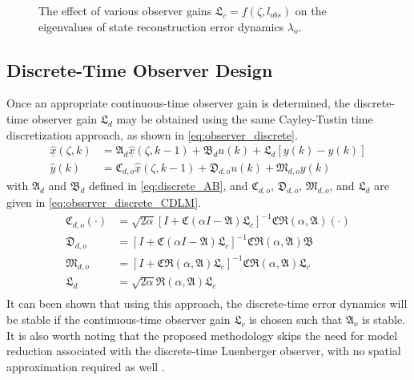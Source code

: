 \begin{figure}[!htbp]
    \centering
    
    \caption{The effect of various observer gains $\mathfrak{L}_c = f(\zeta, l_{obs})$ on the eigenvalues of state reconstruction error dynamics $\lambda_o$.}
    \label{fig:L_vs_lambda}
\end{figure}

\subsection{Discrete-Time Observer Design}
Once an appropriate continuous-time observer gain is determined, the discrete-time observer gain $\mathfrak{L}_d$ may be obtained using the same Cayley-Tustin time discretization approach, as shown in \eqref{eq:observer_discrete}.
\begin{equation} \label{eq:observer_discrete}
    \begin{aligned}
        \underline{\hat{x}}(\zeta, k) &= \mathfrak{A}_d \underline{\hat{x}}(\zeta, k-1) + \mathfrak{B}_d u(k) + \mathfrak{L}_d [y(k) - \hat{y}(k)] \\
        \hat{y}(k) &= \mathfrak{C}_{d,o} \underline{\hat{x}}(\zeta, k-1) + \mathfrak{D}_{d,o} u(k) + \mathfrak{M}_{d,o} y(k)
    \end{aligned}
\end{equation}
with $\mathfrak{A}_d$ and $\mathfrak{B}_d$ defined in \eqref{eq:discrete_AB}, and $\mathfrak{C}_{d,o}$, $\mathfrak{D}_{d,o}$, $\mathfrak{M}_{d,o}$, and $\mathfrak{L}_d$ are given in \eqref{eq:observer_discrete_CDLM}.
\begin{equation} \label{eq:observer_discrete_CDLM}
    \begin{aligned}
        \mathfrak{C}_{d,o} (\cdot) &= \sqrt{2\alpha} \left[ I + \mathfrak{C} (\alpha I - \mathfrak{A}) \mathfrak{L}_c \right]^{-1} \mathfrak{C} \mathfrak{R}(\alpha, \mathfrak{A}) (\cdot) \\
        \mathfrak{D}_{d,o} &= \left[ I + \mathfrak{C} (\alpha I - \mathfrak{A}) \mathfrak{L}_c \right]^{-1} \mathfrak{C} \mathfrak{R}(\alpha, \mathfrak{A}) \mathfrak{B} \\
        \mathfrak{M}_{d,o} &= \left[ I + \mathfrak{C} \mathfrak{R}(\alpha, \mathfrak{A}) \mathfrak{L}_c \right]^{-1} \mathfrak{C} \mathfrak{R}(\alpha, \mathfrak{A}) \mathfrak{L}_c \\
        \mathfrak{L}_d &= \sqrt{2\alpha} \mathfrak{R}(\alpha, \mathfrak{A}) \mathfrak{L}_c \\
    \end{aligned}
\end{equation}
It can been shown that using this approach, the discrete-time error dynamics will be stable if the continuous-time observer gain $\mathfrak{L}_c$ is chosen such that $\mathfrak{A}_o$ is stable. It is also worth noting that the proposed methodology skips the need for model reduction associated with the discrete-time Luenberger observer, with no spatial approximation required as well \cite{dochain2000state,dochain2001state,alonso2004optimal, Ali2015Ali2015Review,Khatibi2021Model}.

